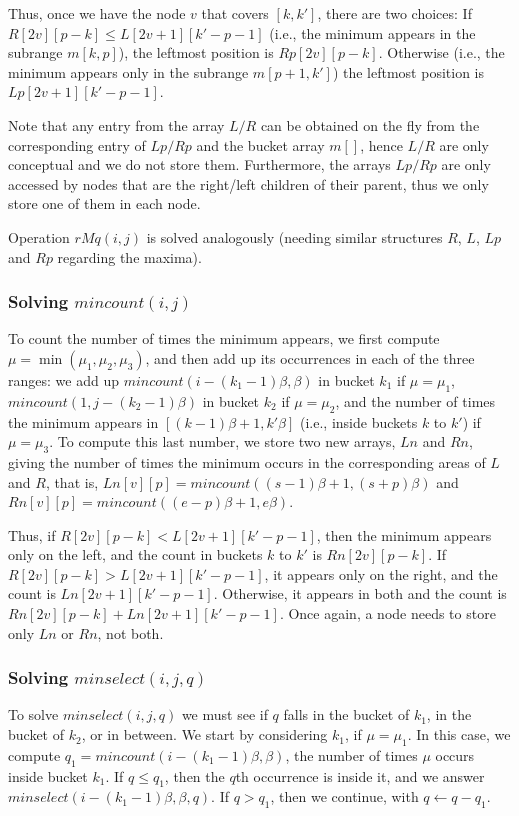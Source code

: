 \documentclass[11pt]{article}
\newcommand{\0}{\mathit{0}}
\newcommand{\1}{\mathit{1}}
\newcommand{\rMq}{\mathit{rMq}}
\newcommand{\mincount}{\mathit{mincount}}
\newcommand{\minselect}{\mathit{minselect}}
\begin{document}
Thus, once we have the node $v$ that covers $[k,k']$, there are two
choices: If $R[2v][p-k] \le L[2v+1][k'-p-1]$ (i.e., the minimum appears 
in the subrange $m[k,p]$), the leftmost position is $Rp[2v][p-k]$. Otherwise 
(i.e., the minimum appears only in the subrange $m[p+1,k']$) the leftmost
position is $Lp[2v+1][k'-p-1]$. 

Note that any entry from the array $L/R$ can be
obtained on the fly from the corresponding entry of $Lp/Rp$ and the bucket
array $m[]$, hence $L/R$ are only conceptual and we do not store them.
Furthermore, the arrays $Lp/Rp$ are only accessed by nodes that are the
right/left children of their parent, thus we only store one of them in each
node. 

Operation $\rMq(i,j)$ is solved analogously (needing similar structures $R$, 
$L$, $Lp$ and $Rp$ regarding the maxima).

\subsubsection{Solving $\mincount(i,j)$} \label{sec:mincount}

To count the number of times the minimum appears, we first compute 
$\mu=\min(\mu_1,\mu_2,\mu_3)$, and then add up its occurrences in each of the
three ranges: we add up $\mincount(i - (k_1-1)\beta,\beta)$ in bucket $k_1$ if
$\mu=\mu_1$, $\mincount(1,j - (k_2-1)\beta)$ in bucket $k_2$ if $\mu=\mu_2$,
and the number of times the minimum appears in $[(k-1)\beta+1,k'\beta]$ 
(i.e., inside buckets $k$ to $k'$) if $\mu=\mu_3$. To compute this last number,
we store two new arrays, $Ln$ and $Rn$, giving the number of times the minimum
occurs in the corresponding areas of $L$ and $R$, that is,
$Ln[v][p] = \mincount((s-1)\beta+1,(s+p)\beta)$ and
$Rn[v][p] = \mincount((e-p)\beta+1,e\beta)$. 

Thus, if $R[2v][p-k] < L[2v+1][k'-p-1]$, then the minimum appears only on the
left, and the count in buckets $k$ to $k'$ is $Rn[2v][p-k]$. If 
$R[2v][p-k] > L[2v+1][k'-p-1]$, it appears only on the right, and the count is
$Ln[2v+1][k'-p-1]$. Otherwise, it appears in both and the count is
$Rn[2v][p-k] + Ln[2v+1][k'-p-1]$.  Once again, a node needs to store only
$Ln$ or $Rn$, not both.

\subsubsection{Solving $\minselect(i,j,q)$}

To solve $\minselect(i,j,q)$ we must see if $q$ falls in the bucket of $k_1$,
in the bucket of $k_2$, or in between. We start by considering $k_1$, if
$\mu=\mu_1$. In this case, we compute $q_1 = \mincount(i - (k_1-1)\beta,\beta)$,
the number of times $\mu$ occurs inside bucket $k_1$. If $q \le q_1$, then the
$q$th occurrence is inside it, and we answer
$\minselect(i - (k_1-1)\beta,\beta,q)$. If $q>q_1$, then we continue, with
$q \leftarrow q-q_1$.
\end{document}
